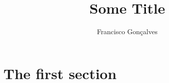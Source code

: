 \documentclass[12pt]{article}
\title{Some Title}
\author{Francisco Gon\c{c}alves}%
\theoremstyle{definition}
\theoremstyle{definition}
\begin{document}
\maketitle
\thispagestyle{empty}




\newpage{}



\section{The first section}

\blindtext{}
\end{document}
